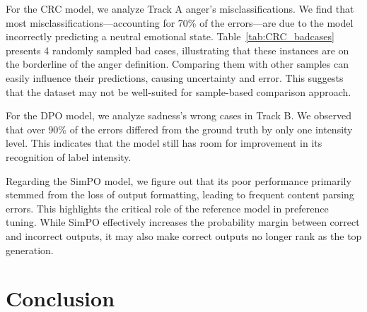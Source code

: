 \documentclass[11pt]{article}
\begin{document}

For the CRC model, we analyze Track A anger's misclassifications. We find that most misclassifications—accounting for 70\% of the errors—are due to the model incorrectly predicting a neutral emotional state. Table~\ref{tab:CRC_badcases} presents 4 randomly sampled bad cases, illustrating that these instances are on the borderline of the anger definition. Comparing them with other samples can easily influence their predictions, causing uncertainty and error. This suggests that the dataset may not be well-suited for sample-based comparison approach.

For the DPO model, we analyze sadness's wrong cases in Track B. We observed that over 90\% of the errors differed from the ground truth by only one intensity level. This indicates that the model still has room for improvement in its recognition of label intensity.

Regarding the SimPO model, we figure out that its poor performance primarily stemmed from the loss of output formatting, leading to frequent content parsing errors. This highlights the critical role of the reference model in preference tuning. While SimPO effectively increases the probability margin between correct and incorrect outputs, it may also make correct outputs no longer rank as the top generation.

\section{Conclusion}

\end{document}
